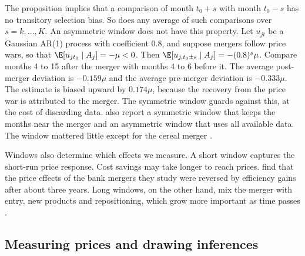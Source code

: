 The proposition implies that a comparison of month $t_0+s$ with month $t_0-s$ has no transitory selection bias.
So does any average of such comparisons over $s=k,\dots,K$. An asymmetric window does not have this property. Let
$u_{jt}$ be a Gaussian AR(1) process with coefficient $0.8$, and suppose mergers follow price wars, so that
$\E[u_{jt_0}\mid A_j]=-\mu<0$. Then $\E[u_{j,t_0\pm s}\mid A_j]=-(0.8)^{s}\mu$. Compare months 4 to 15 after
the merger with months 4 to 6 before it. The average post-merger deviation is $-0.159\mu$ and the average
pre-merger deviation is $-0.333\mu$. The estimate is biased upward by $0.174\mu$, because the recovery from the
price war is attributed to the merger. The symmetric window guards against this, at the cost of discarding data.
\citet{AshenfelterHosken2010} also report a symmetric window that keeps the months near the merger and an
asymmetric window that uses all available data. The window mattered little except for the cereal merger
\citep[p.~26]{AshenfelterHosken2008}.

Windows also determine which effects we measure. A short window captures the short-run price response. Cost
savings may take longer to reach prices. \citet{FocarelliPanetta2003} find that the price effects of the bank
mergers they study were reversed by efficiency gains after about three years. Long windows, on the other hand, mix the merger
with entry, new products and repositioning, which grow more important as time passes \citep[footnote~49]{AshenfelterHosken2008}.

\subsection{Measuring prices and drawing inferences}\label{sec:11-retro-measure}

